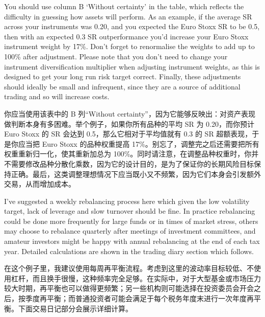 \bipairgap

\begin{englishblock} You should use column B ‘Without certainty' in the table, which reflects the difficulty in guessing how assets will perform. As an example, if the average SR across your instruments was 0.20, and you expected the Euro Stoxx SR to be 0.5, then with an expected 0.3 SR outperformance you'd increase your Euro Stoxx instrument weight by 17\%. Don't forget to renormalise the weights to add up to 100\% after adjustment. Please note that you don't need to change your instrument diversification multiplier when adjusting instrument weights, as this is designed to get your long run risk target correct. Finally, these adjustments should ideally be small and infrequent, since they are a source of additional trading and so will increase costs. \end{englishblock}

\begin{chineseblock}你应当使用该表中的 B 列“Without certainty”，因为它能够反映出：对资产表现做判断本身有多困难。举个例子，如果你所有品种的平均 SR 为 0.20，而你预计 Euro Stoxx 的 SR 会达到 0.5，那么它相对于平均值就有 0.3 的 SR 超额表现，于是你应当把 Euro Stoxx 的品种权重提高 17\%。别忘了，调整完之后还需要把所有权重重新归一化，使其重新加总为 100\%。同时请注意，在调整品种权重时，你并不需要修改品种分散化乘数，因为它的设计目的，是为了保证你的长期风险目标保持正确。最后，这类调整理想情况下应当既小又不频繁，因为它们本身会引发额外交易，从而增加成本。\end{chineseblock}


\begin{englishblock} I've suggested a weekly rebalancing process here which given the low volatility target, lack of leverage and slow turnover should be fine. In practice rebalancing could be done more frequently for large funds or in times of market stress, others may choose to rebalance quarterly after meetings of investment committees, and amateur investors might be happy with annual rebalancing at the end of each tax year. Detailed calculations are shown in the trading diary section which follows. \end{englishblock}

\begin{chineseblock}在这个例子里，我建议使用每周再平衡流程。考虑到这里的波动率目标较低、不使用杠杆，而且换手很慢，这种频率完全足够。在实际中，对于大型基金或市场压力较大时期，再平衡也可以做得更频繁；另一些机构则可能选择在投资委员会开会之后，按季度再平衡；而普通投资者可能会满足于每个税务年度末进行一次年度再平衡。下面交易日记部分会展示详细计算。\end{chineseblock}

